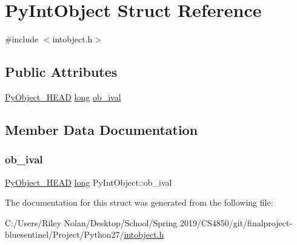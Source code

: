 \hypertarget{struct_py_int_object}{}\section{Py\+Int\+Object Struct Reference}
\label{struct_py_int_object}


{\ttfamily \#include $<$intobject.\+h$>$}

\subsection*{Public Attributes}
\begin{DoxyCompactItemize}
\item 
\mbox{\hyperlink{_python27_2object_8h_a0bf35c1f3ea13f925de94d8593db3b7e}{Py\+Object\+\_\+\+H\+E\+AD}} \mbox{\hyperlink{modsupport_8h_a0cb68e00fb9fb1260ee2daadd9fe6611}{long}} \mbox{\hyperlink{struct_py_int_object_aa77a9bf9a89d57114a62899133e4370c}{ob\+\_\+ival}}
\end{DoxyCompactItemize}


\subsection{Member Data Documentation}
\mbox{\label{struct_py_int_object_aa77a9bf9a89d57114a62899133e4370c}} 
\subsubsection{\texorpdfstring{ob\_ival}{ob\_ival}}
{\footnotesize\ttfamily \mbox{\hyperlink{_python27_2object_8h_a0bf35c1f3ea13f925de94d8593db3b7e}{Py\+Object\+\_\+\+H\+E\+AD}} \mbox{\hyperlink{modsupport_8h_a0cb68e00fb9fb1260ee2daadd9fe6611}{long}} Py\+Int\+Object\+::ob\+\_\+ival}



The documentation for this struct was generated from the following file\+:\begin{DoxyCompactItemize}
\item 
C\+:/\+Users/\+Riley Nolan/\+Desktop/\+School/\+Spring 2019/\+C\+S4850/git/finalproject-\/bluesentinel/\+Project/\+Python27/\mbox{\hyperlink{intobject_8h}{intobject.\+h}}\end{DoxyCompactItemize}
